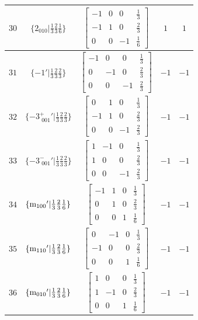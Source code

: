 \documentclass[fleqn,8pt]{jsarticle}
\begin{document}
\begin{longtable}{ccccc}
$ 30 $ & $ \{2{}_{010}|\frac{1}{3} \frac{2}{3} \frac{1}{6}\} $ & $ \begin{bmatrix} -1 & 0 & 0 & \frac{1}{3} \\ -1 & 1 & 0 & \frac{2}{3} \\ 0 & 0 & -1 & \frac{1}{6} \end{bmatrix} $ & $ 1 $ & $ 1 $ \\ \hline
$ 31 $ & $ \{-1{}'|\frac{1}{3} \frac{2}{3} \frac{2}{3}\} $ & $ \begin{bmatrix} -1 & 0 & 0 & \frac{1}{3} \\ 0 & -1 & 0 & \frac{2}{3} \\ 0 & 0 & -1 & \frac{2}{3} \end{bmatrix} $ & $ -1 $ & $ -1 $ \\ \hline
$ 32 $ & $ \{-3^{+}_{\,\,001}{}'|\frac{1}{3} \frac{2}{3} \frac{2}{3}\} $ & $ \begin{bmatrix} 0 & 1 & 0 & \frac{1}{3} \\ -1 & 1 & 0 & \frac{2}{3} \\ 0 & 0 & -1 & \frac{2}{3} \end{bmatrix} $ & $ -1 $ & $ -1 $ \\ \hline
$ 33 $ & $ \{-3^{-}_{\,\,001}{}'|\frac{1}{3} \frac{2}{3} \frac{2}{3}\} $ & $ \begin{bmatrix} 1 & -1 & 0 & \frac{1}{3} \\ 1 & 0 & 0 & \frac{2}{3} \\ 0 & 0 & -1 & \frac{2}{3} \end{bmatrix} $ & $ -1 $ & $ -1 $ \\ \hline
$ 34 $ & $ \{{\rm m}_{100}{}'|\frac{1}{3} \frac{2}{3} \frac{1}{6}\} $ & $ \begin{bmatrix} -1 & 1 & 0 & \frac{1}{3} \\ 0 & 1 & 0 & \frac{2}{3} \\ 0 & 0 & 1 & \frac{1}{6} \end{bmatrix} $ & $ -1 $ & $ -1 $ \\ \hline
$ 35 $ & $ \{{\rm m}_{110}{}'|\frac{1}{3} \frac{2}{3} \frac{1}{6}\} $ & $ \begin{bmatrix} 0 & -1 & 0 & \frac{1}{3} \\ -1 & 0 & 0 & \frac{2}{3} \\ 0 & 0 & 1 & \frac{1}{6} \end{bmatrix} $ & $ -1 $ & $ -1 $ \\ \hline
$ 36 $ & $ \{{\rm m}_{010}{}'|\frac{1}{3} \frac{2}{3} \frac{1}{6}\} $ & $ \begin{bmatrix} 1 & 0 & 0 & \frac{1}{3} \\ 1 & -1 & 0 & \frac{2}{3} \\ 0 & 0 & 1 & \frac{1}{6} \end{bmatrix} $ & $ -1 $ & $ -1 $ \\
\end{longtable}
\end{document}
